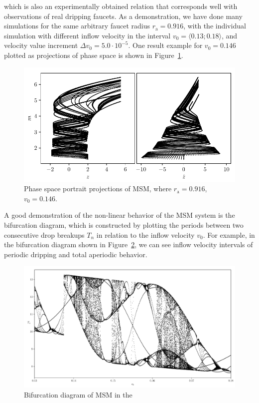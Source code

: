     which is also an experimentally obtained relation that corresponds well with observations of real dripping faucets. As a demonstration, we have done many simulations for the same arbitrary faucet radius $r_{\mathrm{a}} = 0.916$, with the individual simulation with different inflow velocity in the interval $v_0 = \langle 0.13; 0.18 \rangle$, and velocity value increment $\Delta v_0 = 5.0 \cdot 10^{-5}$. One result example for $v_0 = 0.146$ plotted as projections of phase space is shown in Figure~\ref{fig:plot_msm_state_space}. 

    \begin{figure}[H]
    \begin{center}
        \includegraphics[width=1.0\columnwidth]{img/plot_msm_state_space.pdf}
    \end{center}
        \caption{Phase space portrait projections of MSM, where \mbox{$r_{\mathrm{a}} = 0.916$}, $v_0 = 0.146$.}
    \label{fig:plot_msm_state_space}
    \end{figure}

    A good demonstration of the non-linear behavior of the MSM system is the bifurcation diagram, which is constructed by plotting the periods between two consecutive drop breakups $T_n$ in relation to the inflow velocity $v_0$. For example, in the bifurcation diagram shown in Figure~\ref{fig:plot_msm_bifurcation}, we can see inflow velocity intervals of periodic dripping and total aperiodic behavior. 

    \begin{figure}
        \includegraphics[width=1.0\columnwidth]{img/plot_msm_bifurcation.pdf}
        \caption{Bifurcation diagram of MSM in the }
        \label{fig:plot_msm_bifurcation}
    \end{figure}



